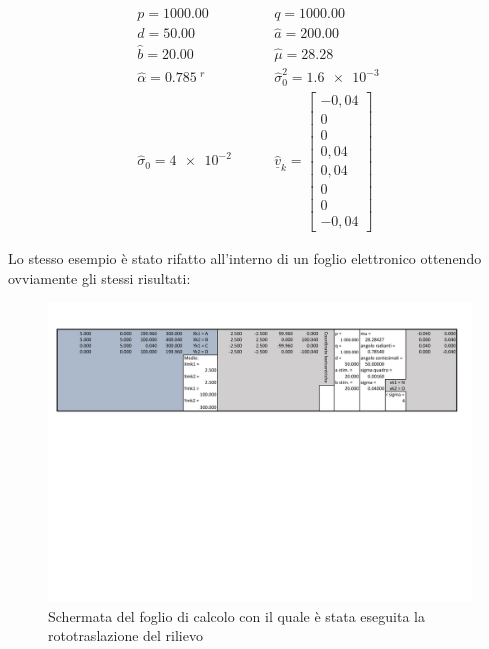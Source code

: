 \begin{align*}
	p=\SI{1000.00}{} \qquad &q=\SI{1000.00}{} \\
	d=\SI{50.00}{} \qquad &\hat{a}=\SI{200.00}{} \\
	\hat{b}=\SI{20.00}{} \qquad &\hat{\mu}=\SI{28.28}{} \\
	\hat{\alpha}=\SI{0.785}{^r} \qquad &\hat{\sigma}_0^2=\SI{1.6e-3}{}\\
	\hat{\sigma}_0=\SI{4e-2}{}	\qquad &\hat{\underline{v}}_k=
	\begin{bmatrix}
	-0,04 \\ 
	0 \\ 
	0 \\ 
	0,04 \\ 
	0,04 \\ 
	0 \\ 
	0 \\ 
	-0,04
	\end{bmatrix} 
\end{align*}

Lo stesso esempio è stato rifatto all'interno di un foglio elettronico ottenendo ovviamente gli stessi risultati:
\begin{figure}[H]
\centering
\caption{Schermata del foglio di calcolo con il quale è stata eseguita la rototraslazione del rilievo}
\includegraphics[width=16cm]{documents/rototraslazioneEsempio.pdf}
\end{figure}
